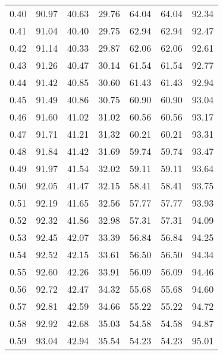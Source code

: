 \begin{tabular}{|c|c|c|c|c|c|c|}
      0.40 &     90.97 &     40.63 &      29.76 &   64.04 &      64.04 &         92.34 \\
      0.41 &     91.04 &     40.40 &      29.75 &   62.94 &      62.94 &         92.47 \\
      0.42 &     91.14 &     40.33 &      29.87 &   62.06 &      62.06 &         92.61 \\
      0.43 &     91.26 &     40.47 &      30.14 &   61.54 &      61.54 &         92.77 \\
      0.44 &     91.42 &     40.85 &      30.60 &   61.43 &      61.43 &         92.94 \\
      0.45 &     91.49 &     40.86 &      30.75 &   60.90 &      60.90 &         93.04 \\
      0.46 &     91.60 &     41.02 &      31.02 &   60.56 &      60.56 &         93.17 \\
      0.47 &     91.71 &     41.21 &      31.32 &   60.21 &      60.21 &         93.31 \\
      0.48 &     91.84 &     41.42 &      31.69 &   59.74 &      59.74 &         93.47 \\
      0.49 &     91.97 &     41.54 &      32.02 &   59.11 &      59.11 &         93.64 \\
      0.50 &     92.05 &     41.47 &      32.15 &   58.41 &      58.41 &         93.75 \\
      0.51 &     92.19 &     41.65 &      32.56 &   57.77 &      57.77 &         93.93 \\
      0.52 &     92.32 &     41.86 &      32.98 &   57.31 &      57.31 &         94.09 \\
      0.53 &     92.45 &     42.07 &      33.39 &   56.84 &      56.84 &         94.25 \\
      0.54 &     92.52 &     42.15 &      33.61 &   56.50 &      56.50 &         94.34 \\
      0.55 &     92.60 &     42.26 &      33.91 &   56.09 &      56.09 &         94.46 \\
      0.56 &     92.72 &     42.47 &      34.32 &   55.68 &      55.68 &         94.60 \\
      0.57 &     92.81 &     42.59 &      34.66 &   55.22 &      55.22 &         94.72 \\
      0.58 &     92.92 &     42.68 &      35.03 &   54.58 &      54.58 &         94.87 \\
      0.59 &     93.04 &     42.94 &      35.54 &   54.23 &      54.23 &         95.01 \\

\end{tabular}
